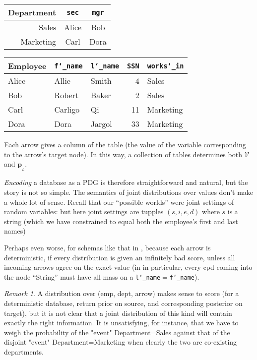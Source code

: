 \documentclass{article}
\theoremstyle{plain}
\theoremstyle{definition}
\theoremstyle{remark}
\newtheorem*{remark}{Remark}
\newcommand\mat[1]{\mathbf{#1}}
\newcommand{\bp}[1][L]{\mat{p}_{\!_{#1}\!}}
\newcommand{\V}{\mathcal V}
\begin{document}
\begin{example}
		\begin{center}
			\begin{tabular}{r|cc}
				\textbf{Department} & \texttt{sec} & \texttt{mgr} \\
				\hline
				Sales & Alice & Bob\\
				Marketing & Carl & Dora\\
			\end{tabular}
			\hspace{1cm}
			\begin{tabular}{l|llrl}
				\textbf{Employee} & \texttt{f\char`_name} & \texttt{l\char`_name} & \texttt{SSN} & \texttt{works\char`_in}\\
				\hline
				Alice & Allie & Smith & 4 & Sales\\
				Bob & Robert & Baker & 2 & Sales\\
				Carl & Carligo & Qi & 11 & Marketing\\
				Dora & Dora & Jargol & 33 & Marketing\\
			\end{tabular}
		\end{center}
		Each arrow gives a column of the table (the value of the variable corresponding to the arrow's target node).		
		In this way, a collection of tables determines both $\V$ and $\bp$. 	
	\end{example}

	\emph{Encoding} a database as a PDG is therefore straightforward and natural, but the story is not so simple. The semantics of joint distributions over values don't make a whole lot of sense. Recall that our ``possible worlds'' were joint settings of random variables: but here joint settings are tupples $(s,i,e,d)$ where $s$ is a string (which we have constrained to equal both the employee's first and last names)

	Perhaps even worse, for schemas like that in , because each arrow is deterministic, if every distribution is given an infinitely bad score, unless all incoming arrows agree on the exact value (in  in particular, every cpd coming into the node ``String'' must have all mass on a  \texttt{l\char`_name}$=$\texttt{f\char`_name}).

	
	\begin{remark}
		A distribution over (emp, dept, arrow) makes sense to score (for a
		deterministic database, return prior on source, and corresponding posterior on
		target), but it is not clear that a joint distribution of this kind will contain
		exactly the right information. It is unsatisfying, for instance, that we have to
		weigh the probability of the "event" Department=Sales against that of the disjoint
		"event" Department=Marketing when clearly the two are co-existing departments.
	\end{remark}
\end{document}
